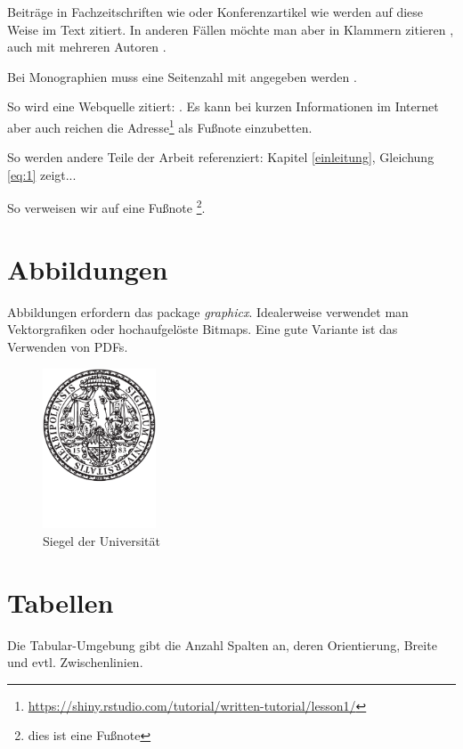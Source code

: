 \documentclass[12pt,oneside]{article}
\begin{document}
Beiträge in Fachzeitschriften wie \citet{clemen1989combining} oder Konferenzartikel wie \citet{he2017mask} werden auf diese Weise im Text zitiert. In anderen Fällen möchte man aber in Klammern zitieren \citep{clemen1989combining}, auch mit mehreren Autoren \citep{clemen1989combining,baumol1958warehouse,he2017mask}.

Bei Monographien muss eine Seitenzahl mit angegeben werden \citep[S. 28]{chollet2018deep}.

So wird eine Webquelle zitiert: \citet{shiny1}. Es kann bei kurzen Informationen im Internet aber auch reichen die Adresse\footnote{\url{https://shiny.rstudio.com/tutorial/written-tutorial/lesson1/}} als Fußnote einzubetten.

So werden andere Teile der Arbeit referenziert: Kapitel \ref{einleitung}, Gleichung \ref{eq:1} zeigt...

So verweisen wir auf eine Fußnote \footnote{dies ist eine Fußnote}.

\section{Abbildungen}

Abbildungen erfordern das package \textit{graphicx}. 
Idealerweise verwendet man Vektorgrafiken oder hochaufgelöste Bitmaps. 
Eine gute Variante ist das Verwenden von PDFs.

\begin{figure}[h]
    \centering
    \includegraphics[width=0.3\textwidth]{siegel.pdf}
    \caption{Siegel der Universität}
    \label{fig:my_label}
\end{figure}


\section{Tabellen}

Die Tabular-Umgebung gibt die Anzahl Spalten an, deren Orientierung, Breite und evtl. Zwischenlinien. 
\end{document}
